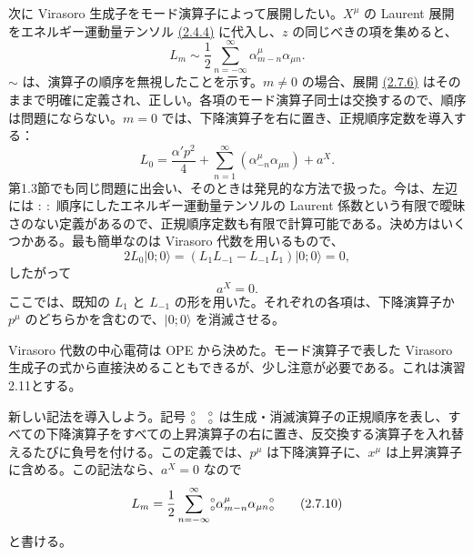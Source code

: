 次に Virasoro 生成子をモード演算子によって展開したい。$X^\mu$ の Laurent 展開をエネルギー運動量テンソル \hyperref[eq:2.4.4]{(2.4.4)} に代入し、$z$ の同じべきの項を集めると、
\begin{equation}
L_m\sim\frac12\sum_{n=-\infty}^{\infty}
\alpha_{m-n}^\mu\alpha_{\mu n}.
\tag{2.7.6}\label{eq:2.7.6}
\end{equation}
$\sim$ は、演算子の順序を無視したことを示す。$m\ne0$ の場合、展開 \hyperref[eq:2.7.6]{(2.7.6)} はそのままで明確に定義され、正しい。各項のモード演算子同士は交換するので、順序は問題にならない。$m=0$ では、下降演算子を右に置き、正規順序定数を導入する：
\begin{equation}
L_0=\frac{\alpha'p^2}{4}
+\sum_{n=1}^\infty(\alpha_{-n}^\mu\alpha_{\mu n})+a^X.
\tag{2.7.7}\label{eq:2.7.7}
\end{equation}
第1.3節でも同じ問題に出会い、そのときは発見的な方法で扱った。今は、左辺には $:\ :$ 順序にしたエネルギー運動量テンソルの Laurent 係数という有限で曖昧さのない定義があるので、正規順序定数も有限で計算可能である。決め方はいくつかある。最も簡単なのは Virasoro 代数を用いるもので、
\begin{equation}
2L_0\lvert0;0\rangle
=(L_1L_{-1}-L_{-1}L_1)\lvert0;0\rangle=0,
\tag{2.7.8}\label{eq:2.7.8}
\end{equation}
したがって
\begin{equation}
a^X=0.
\tag{2.7.9}\label{eq:2.7.9}
\end{equation}
ここでは、既知の $L_1$ と $L_{-1}$ の形を用いた。それぞれの各項は、下降演算子か $p^\mu$ のどちらかを含むので、$\lvert0;0\rangle$ を消滅させる。

Virasoro 代数の中心電荷は OPE から決めた。モード演算子で表した Virasoro 生成子の式から直接決めることもできるが、少し注意が必要である。これは演習2.11とする。

新しい記法を導入しよう。記号 $\canorm{\phantom X}$ は生成・消滅演算子の正規順序を表し、すべての下降演算子をすべての上昇演算子の右に置き、反交換する演算子を入れ替えるたびに負号を付ける。この定義では、$p^\mu$ は下降演算子に、$x^\mu$ は上昇演算子に含める。この記法なら、$a^X=0$ なので
\begin{equation}
L_m=\frac12\sum_{n=-\infty}^{\infty}
\mathopen{{}^{\circ}_{\circ}}\alpha_{m-n}^\mu\alpha_{\mu n}\mathclose{{}^{\circ}_{\circ}}
\tag{2.7.10}\label{eq:2.7.10}
\end{equation}
と書ける。


